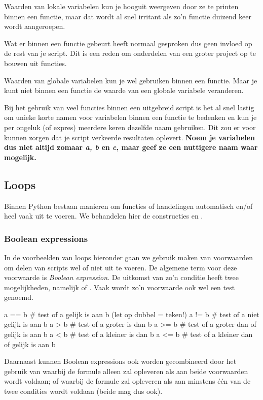\documentclass[a4paper,11pt, fleqn]{article}
\begin{document}
Waarden van lokale variabelen kun je hooguit weergeven door ze te printen binnen een functie, maar dat wordt al snel irritant als zo'n functie duizend keer wordt aangeroepen. 

Wat er binnen een functie gebeurt heeft normaal gesproken dus geen invloed op de rest van je script. Dit is een reden om onderdelen van een groter project op te bouwen uit functies.

Waarden van globale variabelen kun je wel gebruiken binnen een functie. Maar je kunt niet binnen een functie de waarde van een globale variabele veranderen.

Bij het gebruik van veel functies binnen een uitgebreid script is het al snel lastig om unieke korte namen voor variabelen binnen een functie te bedenken en kun je per ongeluk (of expres) meerdere keren dezelfde naam gebruiken. Dit zou er voor kunnen zorgen dat je script verkeerde resultaten oplevert. {\bf Noem je variabelen dus niet altijd zomaar \textit{a, b} en \textit{c}, maar geef ze een nuttigere naam waar mogelijk.}

\subsection{Loops}
Binnen Python bestaan manieren om functies of handelingen automatisch en/of heel vaak uit te voeren. We behandelen hier de constructies  en .

\subsubsection{Boolean expressions}
In de voorbeelden van loops hieronder gaan we gebruik maken van voorwaarden om delen van scripts wel of niet uit te voeren. De algemene term voor deze voorwaarde is \textit{Boolean expression}. De uitkomst van zo'n conditie heeft twee mogelijkheden, namelijk  of . Vaak wordt zo'n voorwaarde ook wel een test genoemd.

\begin{python}
a == b	# test of a gelijk is aan b (let op dubbel = teken!)
a != b	# test of a niet gelijk is aan b
a > b	# test of a groter is dan b
a >= b	# test of a groter dan of gelijk is aan b
a < b	# test of a kleiner is dan b
a <= b	# test of a kleiner dan of gelijk is aan b
\end{python}

Daarnaast kunnen Boolean expressions ook worden gecombineerd door het gebruik van  waarbij de formule alleen   zal opleveren als aan beide voorwaarden wordt voldaan; of  waarbij de formule  zal opleveren als aan minstens \'e\'en van de twee condities wordt voldaan (beide mag dus ook).
\end{document}
